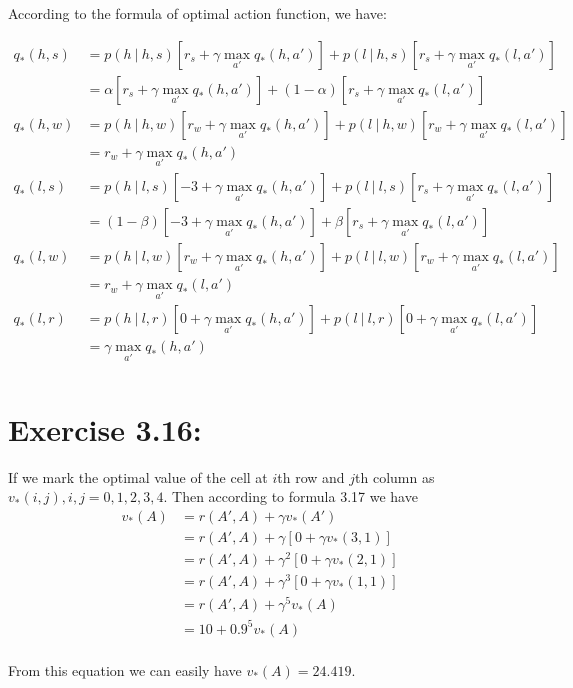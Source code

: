 \documentclass[10pt,letterpaper]{article}
\newcommand\given[1][]{\:#1\vert\:}
\begin{document}
According to the formula of optimal action function, we have:

\begin{align}
q_*(h,s) &= p(h\given h,s)[r_s + \gamma\max_{a'}q_*(h,a')] + p(l\given h,s)[r_s + \gamma\max_{a'}q_*(l,a')]\\
&= \alpha[r_s+\gamma\max_{a'}q_*(h,a')] + (1-\alpha)[r_s + \gamma\max_{a'}q_*(l,a')]\\
q_*(h,w) &= p(h\given h,w)[r_w + \gamma\max_{a'}q_*(h,a')] + p(l\given h,w)[r_w + \gamma\max_{a'}q_*(l,a')]\\
&= r_w+\gamma\max_{a'}q_*(h,a')\\
q_*(l,s) &= p(h\given l,s)[-3 + \gamma\max_{a'}q_*(h,a')] + p(l\given l,s)[r_s + \gamma\max_{a'}q_*(l,a')]\\
&= (1-\beta)[-3+\gamma\max_{a'}q_*(h,a')] + \beta[r_s + \gamma\max_{a'}q_*(l,a')]\\
q_*(l,w) &= p(h\given l,w)[r_w + \gamma\max_{a'}q_*(h,a')] + p(l\given l,w)[r_w + \gamma\max_{a'}q_*(l,a')]\\
&= r_w + \gamma\max_{a'}q_*(l,a')\\
q_*(l,r) &= p(h\given l,r)[0 + \gamma\max_{a'}q_*(h,a')] + p(l\given l,r)[0 + \gamma\max_{a'}q_*(l,a')]\\
&= \gamma\max_{a'}q_*(h,a')\\
\end{align}


\section*{Exercise 3.16: }
\label{3.16}

If we mark the optimal value of the cell at $i$th row and $j$th column as $v_*(i,j), i,j=0,1,2,3,4$. Then according to formula 3.17 we have
\begin{align}
v_*(A) &= r(A',A) + \gamma v_*(A')\\
&= r(A',A) + \gamma[0 + \gamma v_*(3,1)]\\
&= r(A',A) + \gamma^2[0 + \gamma v_*(2,1)]\\
&= r(A',A) + \gamma^3[0 + \gamma v_*(1,1)]\\
&= r(A',A) + \gamma^5v_*(A)\\
&= 10 + 0.9^5v_*(A)\\
\end{align}

From this equation we can easily have $v_*(A) = 24.419$.
\clearpage
\end{document}
